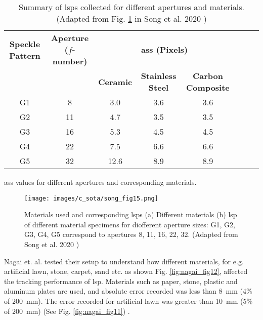 \begin{table}[h]
        \begin{subtable}{\textwidth}
            \centering
            \footnotesize
            \begin{tabular}{cccccccc}
                \toprule
                \textbf{Speckle Pattern} & \textbf{Aperture ($f$-number)} & \multicolumn{3}{c}{\textbf{\gls{ass} (Pixels)}} \\
                &  & \multicolumn{1}{c}{\textbf{Ceramic}} & \multicolumn{1}{c}{\textbf{Stainless Steel}} & \multicolumn{1}{c}{\textbf{Carbon Composite}} \\
                \midrule
                G1 & 8 & 3.0 & 3.6 & 3.6 \\
                G2 & 11 & 4.7 & 3.5 & 3.5 \\
                G3 & 16 & 5.3 & 4.5 & 4.5 \\
                G4 & 22 & 7.5 & 6.6 & 6.6 \\
                G5 & 32 & 12.6 & 8.9 & 8.9 \\
                \bottomrule
            \end{tabular}
        \caption{\gls{ass} values for different apertures and corresponding materials.}
        \end{subtable}

        \caption{Summary of \glspl{lsp} collected for different apertures and materials. (Adapted from Fig. \ref{fig:song_fig15} in Song et al. 2020 \cite{song})}
        \label{table:song_table_g}
    \end{table}

    \begin{figure}[h]
        \centering
        \texttt{[image: images/c\_sota/song\_fig15.png]}
        \caption{Materials used and corresponding \glspl{lsp} (a) Different materials (b) \gls{lsp} of different material specimens for diofferent aperture sizes: G1, G2, G3, G4, G5 correspond to apertures 8, 11, 16, 22, 32. (Adapted from Song et al. 2020 \cite{song})}
        \label{fig:song_fig15}
    \end{figure}

    \clearpage

    \vspace{5mm}
    \noindent Nagai et. al. tested their setup to understand how different materials, for e.g. artificial lawn, stone, carpet, sand etc. as shown Fig. \ref{fig:nagai_fig12}, affected the tracking performance of \gls{lsp}. Materials such as paper, stone, plastic and aluminum plates are used, and absolute error recorded was less than \SI{8}{\milli\meter} (4\% of \SI{200}{\milli\meter}). The error recorded for artificial lawn was greater than \SI{10}{\milli\meter} (5\% of \SI{200}{\milli\meter}) (See Fig. \ref{fig:nagai_fig11}) \cite{nagai}.


